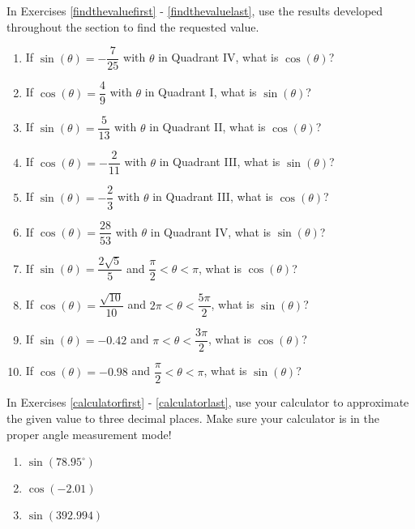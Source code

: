 \documentclass{ximera}
\begin{document}
\newpage

In Exercises \ref{findthevaluefirst} - \ref{findthevaluelast}, use the results developed throughout the section to find the requested value.

\begin{enumerate}

\setcounter{enumi}{\value{HW}}

\item If $\sin(\theta) = -\dfrac{7}{25}$ with $\theta$ in Quadrant IV, what is $\cos(\theta)$? \label{findthevaluefirst}
\item If $\cos(\theta) = \dfrac{4}{9}$ with $\theta$ in Quadrant I, what is $\sin(\theta)$?
\item If $\sin(\theta) = \dfrac{5}{13}$ with $\theta$ in Quadrant II, what is $\cos(\theta)$?
\item If $\cos(\theta) = -\dfrac{2}{11}$ with $\theta$ in Quadrant III, what is $\sin(\theta)$?
\item If $\sin(\theta) = -\dfrac{2}{3}$ with $\theta$ in Quadrant III, what is $\cos(\theta)$?
\item If $\cos(\theta) = \dfrac{28}{53}$ with $\theta$ in Quadrant IV, what is $\sin(\theta)$?
\item  If $\sin(\theta) = \dfrac{2\sqrt{5}}{5}$ and $\dfrac{\pi}{2} < \theta < \pi$, what is $\cos(\theta)$?
\item  If $\cos(\theta) = \dfrac{\sqrt{10}}{10}$ and $2\pi < \theta < \dfrac{5\pi}{2}$, what is $\sin(\theta)$?
\item  If $\sin(\theta) = -0.42$ and $\pi < \theta < \dfrac{3\pi}{2}$, what is  $\cos(\theta)$?
\item  If $\cos(\theta) = -0.98$ and $\dfrac{\pi}{2} < \theta < \pi$, what is $\sin(\theta)$? \label{findthevaluelast}

\setcounter{HW}{\value{enumi}}

\end{enumerate}

In Exercises \ref{calculatorfirst} - \ref{calculatorlast}, use your calculator to approximate the given value to three decimal places.  Make sure your calculator is in the proper angle measurement mode!

\begin{multicols}{3}

\begin{enumerate}

\setcounter{enumi}{\value{HW}}

\item $\sin(78.95^{\circ})$ \label{calculatorfirst}
\item $\cos(-2.01)$
\item $\sin(392.994)$

\setcounter{HW}{\value{enumi}}

\end{enumerate}

\end{multicols}
\end{document}
